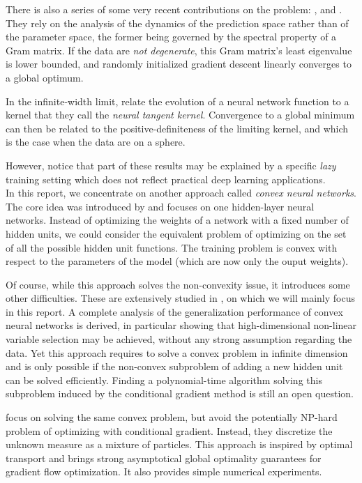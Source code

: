 \documentclass[a4paper, 11pt]{scrartcl}
\begin{document}
There is also a series of some very recent contributions on the problem: \cite{du2018agradient}, \cite{du2018bgradient} and \cite{zou2018stochastic}. They rely on the analysis of the dynamics of the prediction space rather than of the parameter space, the former being governed by the spectral property of a Gram matrix. If the data are \textit{not degenerate}, this Gram matrix’s least eigenvalue is lower bounded, and randomly initialized gradient descent linearly converges to a global optimum.

In the infinite-width limit, \cite{jacot2018neural} relate the evolution of a neural network function to a kernel that they call the \textit{neural tangent kernel}. Convergence to a global minimum can then be related to the positive-definiteness of the limiting kernel, and which is the case when the data are on a sphere.

However, \cite{chizat:hal-01945578} notice that part of these results may be explained by a specific \textit{lazy} training setting which does not reflect practical deep learning applications. \\

In this report, we concentrate on another approach called \textit{convex neural networks}. The core idea was introduced by \cite{bengio2006convex} and focuses on one hidden-layer neural networks. Instead of optimizing the weights of a network with a fixed number of hidden units, we could consider the equivalent problem of optimizing on the set of all the possible hidden unit functions. The training problem is convex with respect to the parameters of the model (which are now only the ouput weights).

Of course, while this approach solves the non-convexity issue, it introduces some other difficulties. These are extensively studied in \cite{bach2017breaking}, on which we will mainly focus in this report. A complete analysis of the generalization performance of convex neural networks is derived, in particular showing that high-dimensional non-linear variable selection may be achieved, without any strong assumption regarding the data. Yet this approach requires to solve a convex problem in infinite dimension and is only possible if the non-convex subproblem of adding a new hidden unit can be solved efficiently. Finding a polynomial-time algorithm solving this subproblem induced by the conditional gradient method is still an open question.

\cite{chizat2018global} focus on solving the same convex problem, but avoid the potentially NP-hard problem of optimizing with conditional gradient. Instead, they discretize the unknown measure as a mixture of particles. This approach is inspired by optimal transport and brings strong asymptotical global optimality guarantees for gradient flow optimization. It also provides simple numerical experiments.\\
\end{document}
